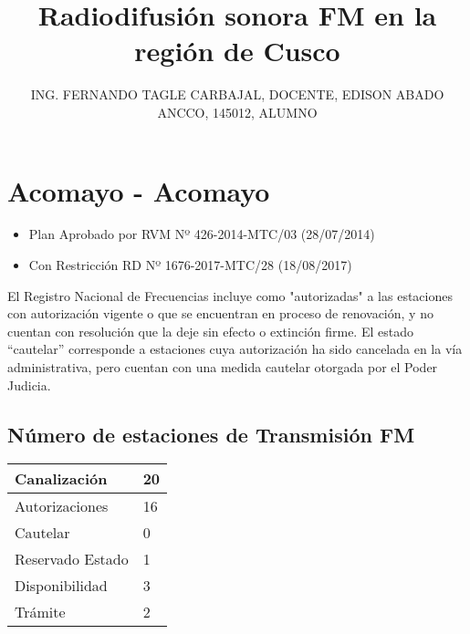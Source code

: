 \documentclass[a4paper]{IEEEtran} %
\begin{document}
	
	\title{Radiodifusión sonora FM en la región de Cusco}
	\author{ING. FERNANDO TAGLE CARBAJAL, DOCENTE, EDISON ABADO ANCCO, 145012, ALUMNO
	}
	
	\maketitle
	
	
\section{Acomayo - Acomayo}

\begin{itemize}
	\item Plan Aprobado por RVM Nº 426-2014-MTC/03 (28/07/2014)
	\item Con Restricción RD Nº 1676-2017-MTC/28 (18/08/2017)
\end{itemize}

El Registro Nacional de Frecuencias incluye como "autorizadas" a las estaciones con autorización vigente o que se encuentran en proceso de renovación, y no cuentan con resolución que la deje sin efecto o extinción firme. El estado “cautelar” corresponde a estaciones cuya autorización ha sido cancelada en la vía administrativa, pero cuentan con una medida cautelar otorgada por el Poder Judicia.

\subsection{Número de estaciones de Transmisión FM}

\begin{tabular}{|l|l|} \hline
	Canalización 			& 20 \\ \hline
	Autorizaciones			& 16 \\ \hline
	Cautelar				& 0 \\ \hline
	Reservado Estado		& 1 \\ \hline
	Disponibilidad			& 3 \\ \hline
	Trámite					& 2 \\ \hline 
\end{tabular}
\end{document}
